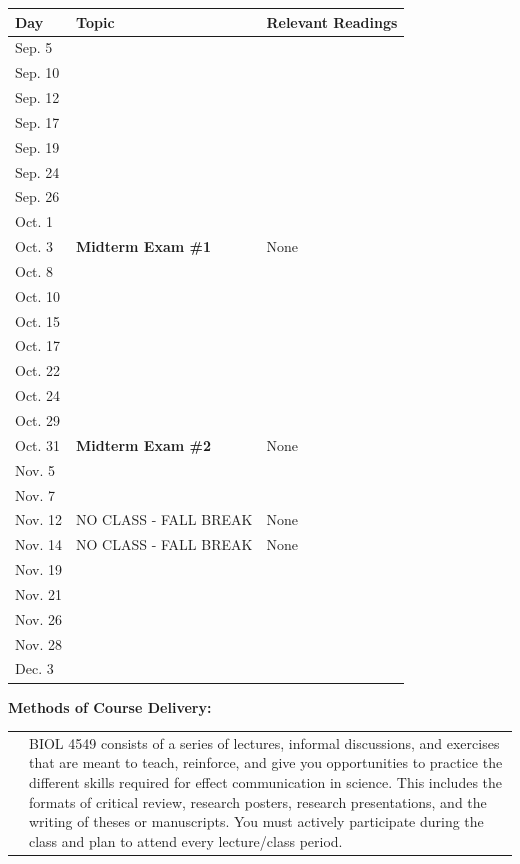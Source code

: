 \documentclass[hidelinks]{article}
\begin{document}
	\begin{table}[H]
		\footnotesize
		\centering
		\begin{tabular}{l p{6cm} p{6cm}}
			\toprule
			\textbf{Day} & \textbf{Topic} & \textbf{Relevant Readings}\\
			\midrule
			Sep. 5 & &\\
			\addlinespace
			Sep. 10 & &\\
			\addlinespace
			Sep. 12 & &\\
			\addlinespace
			Sep. 17 & &\\
			\addlinespace
			Sep. 19 & &\\
			\addlinespace
			Sep. 24 & &\\
			\addlinespace
			Sep. 26 & &\\
			\addlinespace
			Oct. 1 & &\\
			\addlinespace
			Oct. 3 & \textbf{Midterm Exam \#1} & None \\
			\addlinespace
			Oct. 8 & &\\
			\addlinespace
			Oct. 10 & &\\
			\addlinespace
			Oct. 15 & &\\
			\addlinespace
			Oct. 17 & &\\
			\addlinespace
			Oct. 22 & &\\
			\addlinespace
			Oct. 24 & &\\
			\addlinespace
			Oct. 29 & &\\
			\addlinespace
			Oct. 31 & \textbf{Midterm Exam \#2} & None\\
			\addlinespace
			Nov. 5 & &\\
			\addlinespace
			Nov. 7 & &\\
			\addlinespace
			Nov. 12 & NO CLASS - FALL BREAK & None\\
			\addlinespace
			Nov. 14 & NO CLASS - FALL BREAK & None\\
			\addlinespace
			Nov. 19 & &\\
			\addlinespace
			Nov. 21 & &\\
			\addlinespace
			Nov. 26 & &\\
			\addlinespace
			Nov. 28 & &\\
			\addlinespace
			Dec. 3 & &\\
			\bottomrule
		\end{tabular}
	\end{table}	


	\newpage
	\textbf{Methods of Course Delivery:}\\
	\begin{tabular}{@{} p{2.3cm} p{13.9cm}}
		 & BIOL 4549 consists of a series of lectures, informal discussions, and exercises that are meant to teach, reinforce, and give you opportunities to practice the different skills required for effect communication in science. This includes the formats of critical review, research posters, research presentations, and the writing of theses or manuscripts. You must actively participate during the class and plan to attend every lecture/class period. \\
	\end{tabular}	 
\end{document}
